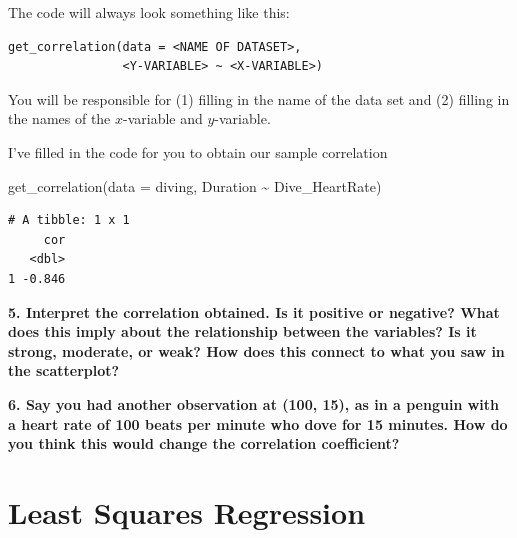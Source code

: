\documentclass[
  letterpaper,
  DIV=11,
  numbers=noendperiod]{scrartcl}
\newenvironment{Shaded}{\begin{snugshade}}{\end{snugshade}}
\newcommand{\AttributeTok}[1]{\textcolor[rgb]{0.40,0.45,0.13}{#1}}
\newcommand{\FunctionTok}[1]{\textcolor[rgb]{0.28,0.35,0.67}{#1}}
\newcommand{\NormalTok}[1]{\textcolor[rgb]{0.00,0.23,0.31}{#1}}
\newcommand{\SpecialCharTok}[1]{\textcolor[rgb]{0.37,0.37,0.37}{#1}}
\begin{document}
The code will always look something like this:

\begin{verbatim}
get_correlation(data = <NAME OF DATASET>, 
                <Y-VARIABLE> ~ <X-VARIABLE>)
\end{verbatim}

You will be responsible for (1) filling in the name of the data set and
(2) filling in the names of the \(x\)-variable and \(y\)-variable.

I've filled in the code for you to obtain our sample correlation

\begin{Shaded}
\begin{Highlighting}[]
\FunctionTok{get\_correlation}\NormalTok{(}\AttributeTok{data =}\NormalTok{ diving, }
\NormalTok{                Duration }\SpecialCharTok{\textasciitilde{}}\NormalTok{ Dive\_HeartRate)}
\end{Highlighting}
\end{Shaded}

\begin{verbatim}
# A tibble: 1 x 1
     cor
   <dbl>
1 -0.846
\end{verbatim}

\textbf{5. Interpret the correlation obtained. Is it positive or
negative? What does this imply about the relationship between the
variables? Is it strong, moderate, or weak? How does this connect to
what you saw in the scatterplot?}


\textbf{6. Say you had another observation at (100, 15), as in a penguin
with a heart rate of 100 beats per minute who dove for 15 minutes. How
do you think this would change the correlation coefficient?}


\hypertarget{least-squares-regression}{%
\section{Least Squares Regression}\label{least-squares-regression}}
\end{document}
